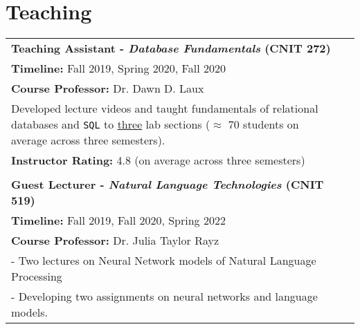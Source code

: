 \documentclass[11pt]{article}
\begin{document}
\renewcommand*{\arraystretch}{1}
\section*{Teaching}
\begin{tabularx}{\textwidth}{@{}p{}l}
\large \textbf{Teaching Assistant - \textit{Database Fundamentals} (CNIT 272)}\\
\textbf{Timeline:} Fall 2019, Spring 2020, Fall 2020\\
\textbf{Course Professor:} Dr. Dawn D. Laux\\
Developed lecture videos and taught fundamentals of relational databases and \texttt{SQL} to \underline{three} lab sections ($\approx$ 70 students on average across three semesters).\\
\textbf{Instructor Rating:} 4.8 (on average across three semesters)\\\\

\large \textbf{Guest Lecturer - \textit{Natural Language Technologies} (CNIT 519)}\\
\textbf{Timeline:} Fall 2019, Fall 2020, Spring 2022\\
\textbf{Course Professor:} Dr. Julia Taylor Rayz\\
- Two lectures on Neural Network models of Natural Language Processing\\
- Developing two assignments on neural networks and language models.
\end{tabularx}

\end{document}

